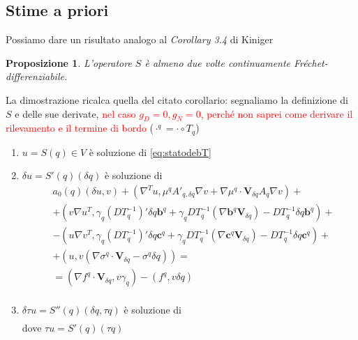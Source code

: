 \documentclass[a4paper,11pt]{article}
\newtheorem{prop}{Proposizione}
\theoremstyle{remark}
\begin{document}
\subsection{Stime a priori}
Possiamo dare un risultato analogo al \emph{Corollary 3.4} di Kiniger
\begin{prop} L'operatore $S$ \`e almeno due volte continuamente Fr\'echet-differenziabile.
\end{prop}
La dimostrazione ricalca quella del citato corollario: segnaliamo la definizione di $S$ e delle sue derivate, \textcolor{red}{nel caso $g_D=0, g_N=0$, perch\'e non saprei come derivare il rilevamento e il termine di bordo} ($\cdot^q = \cdot\circ T_q$)
\begin{enumerate}
 \item $u=S(q)\in V$ \`e soluzione di \eqref{eq:statodebT}
 \item $\delta u=S'(q)(\delta q)$ \`e soluzione di 
	\begin{align*}
	 &a_0(q)(\delta u,v)
	+ (\nabla^Tu,\mu^qA'_{q,\delta q}\nabla v + \nabla\mu^q\cdot \mathbf{V}_{\delta q}A_q\nabla v) + \\
	&+ (v\nabla u^T,\gamma_q(DT^{-1}_q)'\delta q\mathbf{b}^q+\gamma_qDT^{-1}_q(\nabla\mathbf{b}^q\mathbf{V}_{\delta q})-DT^{-1}_q\delta q\mathbf{b}^q) + \\
	&- (u\nabla v^T,\gamma_q(DT^{-1}_q)'\delta q\mathbf{c}^q+\gamma_qDT^{-1}_q(\nabla\mathbf{c}^q\mathbf{V}_{\delta q})-DT^{-1}_q\delta q\mathbf{c}^q) + \\
	&+ (u,v(\nabla\sigma^q\cdot \mathbf{V}_{\delta q} - \sigma^q\delta q)) = \\
	&=  (\nabla f^q\cdot\mathbf{V}_{\delta q}, v\gamma_q) - (f^q,v\delta q)\\
	\end{align*}
 \item $\delta\tau u=S''(q)(\delta q,\tau q)$ \`e soluzione di 
	\begin{align*}
	\end{align*}
	dove $\tau u = S'(q)(\tau q)$
\end{enumerate}
\end{document}
